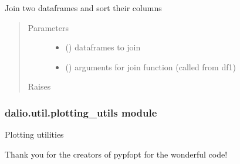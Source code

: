 \documentclass[letterpaper,10pt,english]{sphinxmanual}
\begin{document}
\begin{fulllineitems}
\label{\detokenize{dalio.util:dalio.util.level_utils.mi_join}}
Join two dataframes and sort their columns
\begin{quote}\begin{description}
\item[{Parameters}] \leavevmode\begin{itemize}
\item {} 
 (\sphinxstyleliteralemphasis{\sphinxupquote{,}}) \textendash{} dataframes to join

\item {} 
 (\sphinxstyleliteralemphasis{\sphinxupquote{,}}) \textendash{} 
arguments for join function (called from df1)


\end{itemize}

\item[{Raises}] \leavevmode
{} \textendash{} 

\end{description}\end{quote}

\end{fulllineitems}



\subsubsection{dalio.util.plotting\_utils module}
\label{\detokenize{dalio.util:module-dalio.util.plotting_utils}}\label{\detokenize{dalio.util:dalio-util-plotting-utils-module}}
Plotting utilities

Thank you for the creators of pypfopt for the wonderful code!
\end{document}
